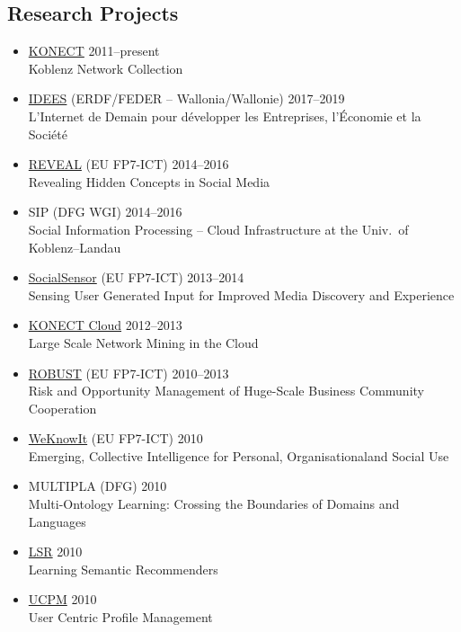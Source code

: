 \documentclass[line,mm]{res}
\newcounter{x}
\newcounter{y}
\newcounter{z}
\begin{document}
\begin{resume}
\section{Research Projects}
\begin{itemize}
\item \href{http://konect.cc/}{KONECT} \hfill 2011--present \\
  Koblenz Network Collection
\item \href{http://nouvelles.unamur.be/upnews.2015-10-01.8995593781}{IDEES} (ERDF/FEDER -- Wallonia/Wallonie) \hfill 2017--2019 \\
  L'Internet de Demain pour développer les Entreprises, l'Économie et la Société 
\item \href{http://revealproject.eu/}{REVEAL} (EU FP7-ICT) \hfill 2014--2016 \\
  Revealing Hidden Concepts in Social Media
\item SIP (DFG WGI) \hfill 2014--2016 \\
  Social Information Processing -- Cloud Infrastructure at the Univ.\ of Koblenz--Landau
\item \href{http://www.socialsensor.eu/}{SocialSensor} (EU FP7-ICT) \hfill 2013--2014 \\
  Sensing User Generated Input for Improved Media Discovery and Experience
\item \href{https://books.google.be/books?id=06fDCQAAQBAJ&pg=PA107}{KONECT Cloud} \hfill 2012--2013 \\
  Large Scale Network Mining in the Cloud
\item \href{http://www.robust-project.eu/}{ROBUST} (EU FP7-ICT) \hfill 2010--2013 \\
  Risk and Opportunity Management of Huge-Scale Business Community Cooperation 
\item \href{http://www.weknowit.eu/}{WeKnowIt} (EU FP7-ICT) \hfill 2010 \\
   Emerging, Collective Intelligence for Personal, Organisationaland Social Use
\item MULTIPLA (DFG) \hfill 2010 \\
  Multi-Ontology Learning:  Crossing the Boundaries of Domains and Languages
\item \href{http://www.dai-labor.de/irml/lsr/}{LSR} \hfill 2010 \\
  Learning Semantic Recommenders
\item \href{http://www.dai-labor.de/en/irml/ucpm/}{UCPM} \hfill 2010 \\
  User Centric Profile Management

\end{itemize}
\end{resume}
\end{document}
